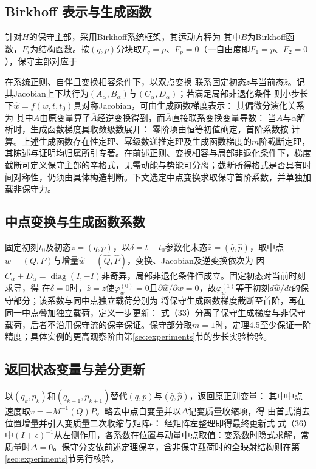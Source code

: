 \subsection{Birkhoff 表示与生成函数}

针对$H$的保守主部，采用Birkhoff系统框架，其运动方程为
其中$B$为Birkhoff函数，$F_i$为结构函数。按$(q,p)$分块取$F_q=p$、$F_p=0$（一自由度即$F_1=p$、$F_2=0$），保守主部对应于

在系统正则、自伴且变换相容条件下，以双点变换
联系固定初态$z$与当前态$\hat z$。记其Jacobian上下块行为$(A_\alpha,B_\alpha)$与$(C_\alpha,D_\alpha)$；若满足局部非退化条件
则小步长下$\hat w=f(w,t,t_0)$具对称Jacobian，可由生成函数梯度表示：
其偏微分演化关系为
其中$A$由原变量算子$\overline A$经逆变换得到，而$\overline A$直接联系变换变量导数：
当$A$与$\alpha$解析时，生成函数梯度具收敛级数展开：
零阶项由恒等初值确定，首阶系数按
计算。上述生成函数存在性定理\citep[第15章，定理4.1]{FengQin2010}、幂级数递推定理\citep[第15章，定理4.4]{FengQin2010}及生成函数梯度的$m$阶截断定理\citep[第15章，定理4.5]{FengQin2010}，其陈述与证明均归属所引专著。在前述正则、变换相容与局部非退化条件下，梯度截断可定义保守主部的辛格式，无需动能与势能可分离；截断所得格式是否具有时间对称性，仍须由具体构造判断。下文选定中点变换求取保守首阶系数，并单独加载非保守力。

\subsection{中点变换与生成函数系数}

固定初刻$t_0$及初态$z=(q,p)$，以$\delta=t-t_0$参数化末态$\hat z=(\hat q,\hat p)$，取中点$w=(Q,P)$与增量$\hat w=(\hat Q,\hat P)$，变换、Jacobian及逆变换依次为
因$C_\alpha+D_\alpha=\operatorname{diag}(I,-I)$非奇异，局部非退化条件恒成立。固定初态对当前时刻求导，得
在$\delta=0$时，$\hat z=z$使$\varphi_w^{(0)}=0$且$\partial\hat w/\partial w=0$，故$\varphi_w^{(1)}$等于初刻$d\hat w/dt$的保守部分；该系数与同中点独立载荷分别为
将保守生成函数梯度截断至首阶，再在同一中点叠加独立载荷，定义一步更新：
式（33）分离了保守生成梯度与非保守载荷，后者不沿用保守流的保辛保证。保守部分取$m=1$时，定理4.5至少保证一阶精度；具体实例的更高观察阶由第\ref{sec:experiments}节的步长实验检验。

\subsection{返回状态变量与差分更新}

以$(q_k,p_k)$和$(q_{k+1},p_{k+1})$替代$(q,p)$与$(\hat q,\hat p)$，返回原正则变量：
其中中点速度取$v=-M^{-1}(Q)P$。略去中点自变量并以$\Delta$记变质量收缩项，得
由首式消去位置增量并引入变质量二次收缩与矩阵$\epsilon$：
经矩阵左整理即得最终更新式
式（36）中$(I+\epsilon)^{-1}$从左侧作用，各系数在位置与动量中点取值：变系数时隐式求解，常质量时$\Delta=0$。保守分支依前述定理保辛，含非保守载荷时的全映射结构则在第\ref{sec:experiments}节另行核验。
